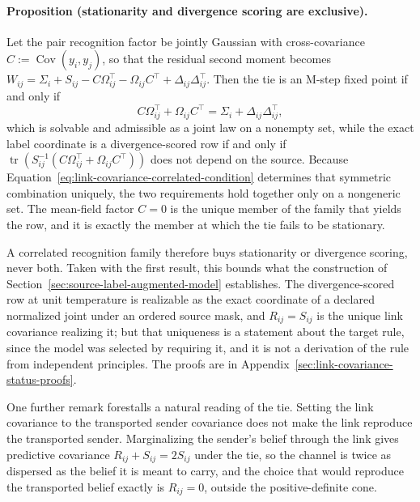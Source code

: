 \paragraph{Proposition (stationarity and divergence scoring are exclusive).} Let the pair recognition factor be jointly Gaussian with cross-covariance \(C:=\operatorname{Cov}(y_i,y_j)\), so that the residual second moment becomes \(W_{ij}=\Sigma_i+S_{ij}-C\Omega_{ij}^\top-\Omega_{ij}C^\top+\Delta_{ij}\Delta_{ij}^\top\). Then the tie is an M-step fixed point if and only if
\begin{equation}
C\Omega_{ij}^\top+\Omega_{ij}C^\top=\Sigma_i+\Delta_{ij}\Delta_{ij}^\top,
\label{eq:link-covariance-correlated-condition}
\end{equation}
which is solvable and admissible as a joint law on a nonempty set, while the exact label coordinate is a divergence-scored row if and only if \(\operatorname{tr}(S_{ij}^{-1}(C\Omega_{ij}^\top+\Omega_{ij}C^\top))\) does not depend on the source. Because Equation~\eqref{eq:link-covariance-correlated-condition} determines that symmetric combination uniquely, the two requirements hold together only on a nongeneric set. The mean-field factor \(C=0\) is the unique member of the family that yields the row, and it is exactly the member at which the tie fails to be stationary.

A correlated recognition family therefore buys stationarity or divergence scoring, never both. Taken with the first result, this bounds what the construction of Section~\ref{sec:source-label-augmented-model} establishes. The divergence-scored row at unit temperature is realizable as the exact coordinate of a declared normalized joint under an ordered source mask, and \(R_{ij}=S_{ij}\) is the unique link covariance realizing it; but that uniqueness is a statement about the target rule, since the model was selected by requiring it, and it is not a derivation of the rule from independent principles. The proofs are in Appendix~\ref{sec:link-covariance-status-proofs}.

One further remark forestalls a natural reading of the tie. Setting the link covariance to the transported sender covariance does not make the link reproduce the transported sender. Marginalizing the sender's belief through the link gives predictive covariance \(R_{ij}+S_{ij}=2S_{ij}\) under the tie, so the channel is twice as dispersed as the belief it is meant to carry, and the choice that would reproduce the transported belief exactly is \(R_{ij}=0\), outside the positive-definite cone.

